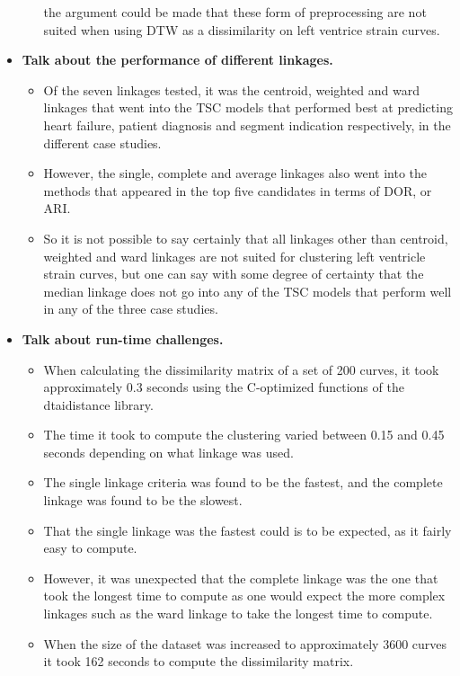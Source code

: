\begin{itemize}
\begin{itemize}
              the argument could be made that these form of preprocessing are not suited when using DTW as a dissimilarity on left ventrice strain curves.
    \end{itemize}
    \item \textbf{Talk about the performance of different linkages.}
    \begin{itemize}
        \item Of the seven linkages tested, it was the centroid, weighted and ward linkages that went into the TSC models 
              that performed best at predicting heart failure, patient diagnosis and segment indication respectively, in the different case studies. 
        \item However, the single, complete and average linkages also went into the methods that appeared in the top five candidates in terms of DOR, or ARI.
        \item So it is not possible to say certainly that all linkages other than centroid, weighted and ward linkages are not suited for clustering left ventricle strain curves,
              but one can say with some degree of certainty that the median linkage does not go into any of the TSC models that perform well in any of the three case studies. 
    \end{itemize}
    \item \textbf{Talk about run-time challenges.}
    \begin{itemize}
        \item When calculating the dissimilarity matrix of a set of 200 curves, it took approximately 0.3 seconds using the C-optimized functions of the dtaidistance library.
        \item The time it took to compute the clustering varied between 0.15 and 0.45 seconds depending on what linkage was used. 
        \item The single linkage criteria was found to be the fastest, and the complete linkage was found to be the slowest. 
        \item That the single linkage was the fastest could is to be expected, as it fairly easy to compute. 
        \item However, it was unexpected that the complete linkage was the one that took the longest time to compute as one would expect the more complex linkages such as the ward linkage
              to take the longest time to compute.
        \item When the size of the dataset was increased to approximately 3600 curves it took 162 seconds to compute the dissimilarity matrix.

\end{itemize}
\end{itemize}
